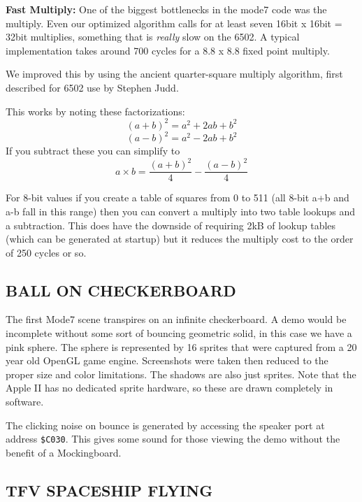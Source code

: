 \documentclass[twocolumn]{article}
\begin{document}
\noindent
{\bf Fast Multiply:}
One of the biggest bottlenecks in the mode7 code was the multiply.
Even our optimized algorithm calls for at least seven
16bit x 16bit = 32bit multiplies, something that is {\em really} slow on 
the 6502.
A typical implementation takes around 700 cycles
for a 8.8 x 8.8 fixed point multiply.


We improved this by using the ancient quarter-square 
multiply algorithm, first described for 6502 use by Stephen Judd.

This works by noting these factorizations:
	\[(a+b)^{2} = a^{2}+2ab+b^{2}\]
	\[(a-b)^{2}=a^{2}-2ab+b^{2}\]
If you subtract these you can simplify to
	\[a\times b =\frac{(a+b)^{2}}{4} - \frac{(a-b)^2}{4}\]

For 8-bit values if you create a table of squares from 0 to 511
(all 8-bit a+b and a-b fall in this range) then you can convert a multiply
into two table lookups and a subtraction.
This does have the downside of requiring 2kB of lookup tables
(which can be generated at startup) but it reduces the multiply
cost to the order of 250 cycles or so.


\subsection{BALL ON CHECKERBOARD}

The first Mode7 scene transpires on an infinite checkerboard.
A demo would be incomplete without some sort of bouncing geometric solid,
in this case we have a pink sphere.
The sphere is represented by 16 sprites that were captured from
a 20 year old OpenGL game engine.
Screenshots were taken then reduced to the proper size and color
limitations.
The shadows are also just sprites.
Note that the Apple II has no dedicated sprite hardware, so these
are drawn completely in software.

The clicking noise on bounce is generated by accessing the speaker port
at address {\tt \$C030}.
This gives some sound for those viewing the demo without the benefit
of a Mockingboard.

\subsection{TFV SPACESHIP FLYING}
\end{document}
